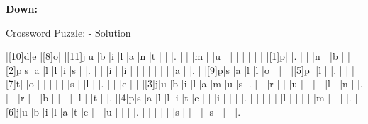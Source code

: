 \documentclass[12pt]{article}
\begin{document}
\begin{PuzzleClues}{\textbf{Down:}}
\end{PuzzleClues}
\newpage
\begin{center}
  \huge{Crossword Puzzle: - Solution}
\end{center}
\vspace{1.5cm}
\PuzzleSolution
\begin{Puzzle}{15}{15}
  |[10]d|e   |[8]o|{}  |[11]j|u   |b   |i   |l   |a   |n   |t   |{}  |{}  |.
  |{}  |{}  |m   |{}  |u   |{}  |{}  |{}  |{}  |{}  |{}  |{}  |[1]p|{}  |.
  |{}  |{}  |n   |{}  |b   |{}  |[2]p|s   |a   |l   |l   |i   |s   |{}  |.
  |{}  |{}  |i   |{}  |i   |{}  |{}  |{}  |{}  |{}  |{}  |{}  |a   |{}  |.
  |{}  |[9]p|s   |a   |l   |l   |o   |{}  |{}  |{}  |[5]p|{}  |l   |{}  |.
  |{}  |{}  |[7]t|{}  |o   |{}  |{}  |{}  |{}  |{}  |s   |{}  |l   |{}  |.
  |{}  |{}  |e   |{}  |{}  |[3]j|u   |b   |i   |l   |a   |m   |u   |s   |.
  |{}  |{}  |r   |{}  |{}  |u   |{}  |{}  |{}  |{}  |l   |{}  |n   |{}  |.
  |{}  |{}  |r   |{}  |{}  |b   |{}  |{}  |{}  |{}  |l   |{}  |t   |{}  |.
  |[4]p|s   |a   |l   |l   |i   |t   |e   |{}  |{}  |i   |{}  |{}  |{}  |.
  |{}  |{}  |{}  |{}  |{}  |l   |{}  |{}  |{}  |{}  |m   |{}  |{}  |{}  |.
  |[6]j|u   |b   |i   |l   |a   |t   |e   |{}  |{}  |u   |{}  |{}  |{}  |.
  |{}  |{}  |{}  |{}  |{}  |s   |{}  |{}  |{}  |{}  |s   |{}  |{}  |{}  |.
\end{Puzzle}
\end{document}
